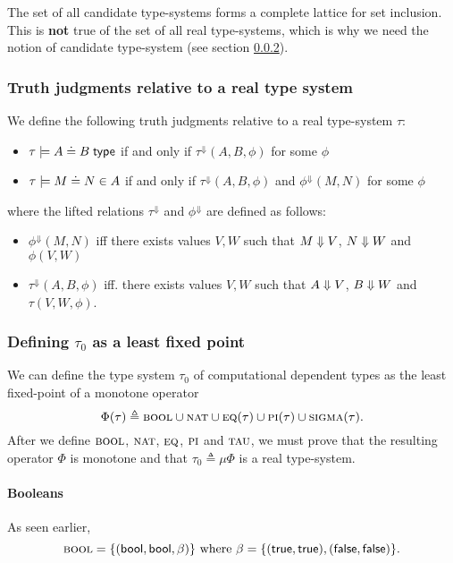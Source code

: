 \documentclass{article} \usepackage{chtt-notes} \usepackage{stmaryrd}
\newcommand{\lift}[1]{{#1}^{\Downarrow}}
\begin{document}
The set of all candidate type-systems forms a complete lattice for set
inclusion. This is \textbf{not} true of the set of all real
type-systems, which is why we need the notion of candidate type-system
(see section \ref{subsub:tau0}).


\subsubsection{Truth judgments relative to a real type system}

We define the following truth judgments relative to a real type-system
$\tau$:
\begin{itemize}
\item $\tau \models \hasTEC{A}{B}$ if and only if
  $\lift{\tau}(A, B, \phi)$ for some $\phi$
\item $\tau \models \hasEEC{M}{N}{A}$ if and only if
  $\lift{\tau}(A, B, \phi)$ and $\lift{\phi}(M, N)$ for some $\phi$
\end{itemize}
where the lifted relations $\lift{\tau}$ and $\lift{\phi}$ are defined
as follows:
\begin{itemize}
\item $\lift{\phi}(M, N)$ iff there exists values $V, W$ such that
  $M \mathrel{\Downarrow} V$, $N \mathrel{\Downarrow} W$ and $\phi(V, W)$
\item $\lift{\tau}(A, B, \phi)$ iff.  there exists values $V, W$ such
  that $A \mathrel{\Downarrow} V$, $B \mathrel{\Downarrow} W$ and $\tau(V, W, \phi)$.
\end{itemize}

\subsubsection{Defining $\tau_0$ as a least fixed
  point}\label{subsub:tau0}

We can define the type system $\tau_0$ of computational dependent
types as the least fixed-point of a monotone operator
\[ \Phi(\tau) \triangleq \textsc{bool} \cup \textsc{nat} \cup
  \textsc{eq}(\tau) \cup \textsc{pi}(\tau) \cup
  \textsc{sigma}(\tau).  \] After we define $\textsc{bool}$,
$\textsc{nat}$, $\textsc{eq}$, $\textsc{pi}$ and $\textsc{tau}$, we
must prove that the resulting operator $\Phi$ is monotone and that
$\tau_0 \triangleq \mu \Phi$ is a real type-system.

\paragraph{Booleans}
As seen earlier,
\[ \textsc{bool} = \{(\mathsf{bool}, \mathsf{bool}, \beta)\} \text{ where } \beta =
  \{(\mathsf{true}, \mathsf{true}), (\mathsf{false}, \mathsf{false})\}. \]
\end{document}
